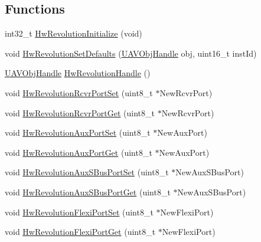 \subsection*{\-Functions}
\begin{DoxyCompactItemize}
\item 
int32\-\_\-t \hyperlink{group___hw_revolution_ga780b31a4fa22766502bae970cc0e6660}{\-Hw\-Revolution\-Initialize} (void)
\item 
void \hyperlink{group___hw_revolution_gaefbe314a6a8442721cf453c62c0ae111}{\-Hw\-Revolution\-Set\-Defaults} (\hyperlink{targets_2_u_a_v_objects_2inc_2uavobjectmanager_8h_a279053e22be53ce9f895043aaeb91e3b}{\-U\-A\-V\-Obj\-Handle} obj, uint16\-\_\-t inst\-Id)
\item 
\hyperlink{targets_2_u_a_v_objects_2inc_2uavobjectmanager_8h_a279053e22be53ce9f895043aaeb91e3b}{\-U\-A\-V\-Obj\-Handle} \hyperlink{group___hw_revolution_ga0119534699339c8f2d53d43281e717c4}{\-Hw\-Revolution\-Handle} ()
\item 
void \hyperlink{group___hw_revolution_gae0ba361a62c8a051cca7d12e6248c9be}{\-Hw\-Revolution\-Rcvr\-Port\-Set} (uint8\-\_\-t $\ast$\-New\-Rcvr\-Port)
\item 
void \hyperlink{group___hw_revolution_gaecec4602657265f91115f9ac62c1a675}{\-Hw\-Revolution\-Rcvr\-Port\-Get} (uint8\-\_\-t $\ast$\-New\-Rcvr\-Port)
\item 
void \hyperlink{group___hw_revolution_ga1351c5eb6e321c7d30944465a6acac8b}{\-Hw\-Revolution\-Aux\-Port\-Set} (uint8\-\_\-t $\ast$\-New\-Aux\-Port)
\item 
void \hyperlink{group___hw_revolution_ga24772f55fd2baff6710e861c4d00b07c}{\-Hw\-Revolution\-Aux\-Port\-Get} (uint8\-\_\-t $\ast$\-New\-Aux\-Port)
\item 
void \hyperlink{group___hw_revolution_ga23582f0f2067c5d3e92fc4bf56c9b24c}{\-Hw\-Revolution\-Aux\-S\-Bus\-Port\-Set} (uint8\-\_\-t $\ast$\-New\-Aux\-S\-Bus\-Port)
\item 
void \hyperlink{group___hw_revolution_ga6c4074d32d98e8f396bc38331c2d1084}{\-Hw\-Revolution\-Aux\-S\-Bus\-Port\-Get} (uint8\-\_\-t $\ast$\-New\-Aux\-S\-Bus\-Port)
\item 
void \hyperlink{group___hw_revolution_ga17bb3d08061fb0abffa8c6b99d144daf}{\-Hw\-Revolution\-Flexi\-Port\-Set} (uint8\-\_\-t $\ast$\-New\-Flexi\-Port)
\item 
void \hyperlink{group___hw_revolution_ga146f0fc36bc0b9dc77b416d3c343af23}{\-Hw\-Revolution\-Flexi\-Port\-Get} (uint8\-\_\-t $\ast$\-New\-Flexi\-Port)
\item 

\end{DoxyCompactItemize}
